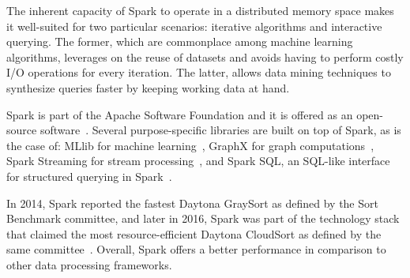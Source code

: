 The inherent capacity of Spark to operate in a distributed memory space makes it well-suited for two particular scenarios: iterative algorithms and interactive querying. The former, which are commonplace among machine learning algorithms, leverages on the reuse of datasets and avoids having to perform costly I/O operations for every iteration. The latter, allows data mining techniques to synthesize queries faster by keeping working data at hand.

Spark is part of the Apache Software Foundation and it is offered as an open-source software~\cite{WebApache2017,WebSpark2017}. Several purpose-specific libraries are built on top of Spark, as is the case of: MLlib for machine learning~\cite{Meng2016}, GraphX for graph computations~\cite{Xin2013}, Spark Streaming for stream processing~\cite{Zahariaa}, and Spark SQL, an \mbox{SQL-like} interface for structured querying in Spark~\cite{Armbrust2015a}.

In 2014, Spark reported the fastest Daytona GraySort as defined by the Sort Benchmark committee, and later in 2016, Spark was part of the technology stack that claimed the most resource-efficient Daytona CloudSort as defined by the same committee~\cite{WebSortBenchmark2017,Xin2014,Wang}. Overall, Spark offers a better performance in comparison to other data processing frameworks.

%
%
%
%
%
